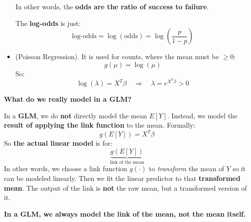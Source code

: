 \begin{itemize}
\begin{remarkbox}
        \highspace{}
        In other words, the \textbf{odds are the ratio of success to failure}.

        \highspace{}
        The \textbf{log-odds} is just:
        \begin{equation}
            \text{log-odds} = \log(\text{odds}) = \log \left( \frac{p}{1 - p} \right)
        \end{equation}
    \end{remarkbox}


    \item {} (Poisson Regression). It is used for counts, where the mean must be $\geq 0$:
    \begin{equation}
        g(\mu) = \log(\mu)
    \end{equation}
    So:
    \begin{equation}
        \log(\lambda) = X^T \beta \quad \Longrightarrow \quad \lambda = e^{X^T \beta} > 0
    \end{equation}
\end{itemize}

\highspace
\begin{flushleft}
    \textcolor{Green3}{ \textbf{What do we really model in a GLM?}}
\end{flushleft}
In a \textbf{GLM}, we do \textbf{not} directly model the mean $E[Y]$. Instead, we model the \textbf{result of applying the link function} to the mean. Formally:
\begin{equation*}
    g(E[Y]) = X^T \beta    
\end{equation*}
So \textbf{the actual linear model} is for:
\begin{equation*}
    \underbrace{g(E[Y])}_{\text{link of the mean}}
\end{equation*}
In other words, we choose a link function $g(\cdot)$ to \emph{transform} the mean of $Y$ so it can be modeled linearly. Then we fit the linear predictor to that \textbf{transformed mean}. The output of the link is \textbf{not} the raw mean, but a transformed version of it.

\highspace
\textbf{In a GLM, we always model the link of the mean, not the mean itself.}